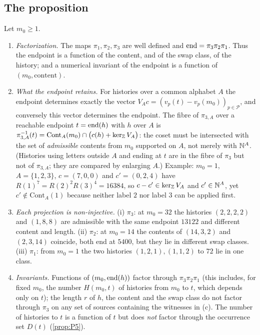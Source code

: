 \subsection{The proposition}
\begin{proposition}\label{prop:P1}
Let $m_0\ge1$.
\begin{enumerate}[label=(\alph*),itemsep=1pt]
\item \emph{Factorization.} The maps $\pi_1,\pi_2,\pi_3$ are well defined and $\operatorname{end}=\pi_3\pi_2\pi_1$. Thus the endpoint is a function of the content, and of the swap class, of the history; and a numerical invariant of the endpoint is a function of $(m_0,\text{content})$.
\item \emph{What the endpoint retains.} For histories over a common alphabet $A$ the endpoint determines exactly the vector $V_Ac=(v_p(t)-v_p(m_0))_{p\in\mathcal P}$, and conversely this vector determines the endpoint. The fibre of $\pi_{3,A}$ over a reachable endpoint $t=\operatorname{end}(h)$ with $h$ over $A$ is $\pi_{3,A}^{-1}(t)=\mathrm{Cont}_A(m_0)\cap\bigl(c(h)+\ker_{\mathbb Z}V_A\bigr)$: the coset must be intersected with the set of \emph{admissible} contents from $m_0$ supported on $A$, not merely with $\mathbb N^A$. (Histories using letters outside $A$ and ending at $t$ are in the fibre of $\pi_3$ but not of $\pi_{3,A}$; they are compared by enlarging $A$.) Example: $m_0=1$, $A=\{1,2,3\}$, $c=(7,0,0)$ and $c'=(0,2,4)$ have $R(1)^7=R(2)^2R(3)^4=16384$, so $c-c'\in\ker_\mathbb Z V_A$ and $c'\in\mathbb N^A$, yet $c'\notin\mathrm{Cont}_A(1)$ because neither label $2$ nor label $3$ can be applied first.
\item \emph{Each projection is non-injective.} (i) $\pi_3$: at $m_0=32$ the histories $(2,2,2,2)$ and $(1,8,8)$ are admissible with the same endpoint $13122$ and different content and length. (ii) $\pi_2$: at $m_0=14$ the contents of $(14,3,2)$ and $(2,3,14)$ coincide, both end at $5400$, but they lie in different swap classes. (iii) $\pi_1$: from $m_0=1$ the two histories $(1,2,1),(1,1,2)$ to $72$ lie in one class.
\item \emph{Invariants.} Functions of $(m_0,\operatorname{end}(h))$ factor through $\pi_3\pi_2\pi_1$ (this includes, for fixed $m_0$, the number $H(m_0,t)$ of histories from $m_0$ to $t$, which depends only on $t$); the length $r$ of $h$, the content and the swap class do not factor through $\pi_3$ on any set of sources containing the witnesses in (c). The number of histories to $t$ is a function of $t$ but does \emph{not} factor through the occurrence set $D(t)$ (\cref{prop:P5}).
\end{enumerate}
\end{proposition}
